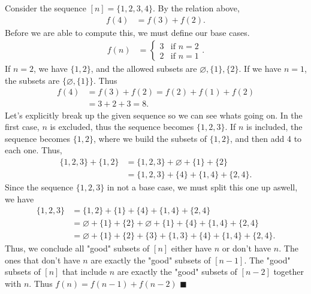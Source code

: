 \documentclass{report}
\begin{document}
\begin{itemize}
\begin{enumerate}
            \end{enumerate}
            \bigbreak \noindent 
            Consider the sequence $[n] = \{1,2,3,4\}$. By the relation above, 
            \begin{align*}
                f(4) &= f(3) + f(2) 
            .\end{align*}
            Before we are able to compute this, we must define our base cases. 
            \begin{align*}
                f(n) &= \begin{cases}
                    3 & \text{if } n = 2 \\
                    2 & \text{if } n =1
                \end{cases}
            .\end{align*}
            If $n=2$, we have $\{1,2\}$, and the allowed subsets are $\varnothing, \{1\}, \{2\} $. If we have $n=1$, the subsets are $\{\varnothing, \{1\}\} $. Thus
            \begin{align*}
                f(4) &= f(3) + f(2) = f(2) + f(1) + f(2)  \\
                     &= 3 + 2 + 3 = 8               
            .\end{align*}
            Let's explicitly break up the given sequence so we can see whats going on. In the first case, $n$ is excluded, thus the sequence becomes $\{1,2,3\}$. If $n$ is included, the sequence becomes $\{1,2\}$, where we build the subsets of $\{1,2\}$, and then add 4 to each one. Thus,
            \begin{align*}
                \{1,2,3\} + \{1,2\} &= \{1,2,3\}  + \varnothing + \{1\} + \{2\} \\
                                    &= \{1,2,3\} + \{4\} + \{1,4\} + \{2,4\}
            .\end{align*}
            Since the sequence $\{1,2,3\}$ in not a base case, we must split this one up aswell, we have
            \begin{align*}
                \{1,2,3\} &= \{1,2\} + \{1\}  + \{4\} + \{1,4\} + \{2,4\} \\
                          &=  \varnothing + \{1\} + \{2\} + \varnothing + \{1\} + \{4\} + \{1,4\} + \{2,4\} \\
                          &= \varnothing + \{1\} + \{2\} + \{3\} + \{1,3\} + \{4\} + \{1,4\} + \{2,4\} 
            .\end{align*}
            Thus, we conclude all "good" subsets of $[n]$ either have $n$ or don't have $n$. The ones that don't have $n$ are exactly the "good" subsets of $[n-1]$. The "good" subsets of $[n]$ that include $n$ are exactly the "good" subsets of $[n-2]$ together with $n$. Thus $f(n) = f(n-1) + f(n-2) $ $\blacksquare$
            
    \end{itemize}
\end{document}
